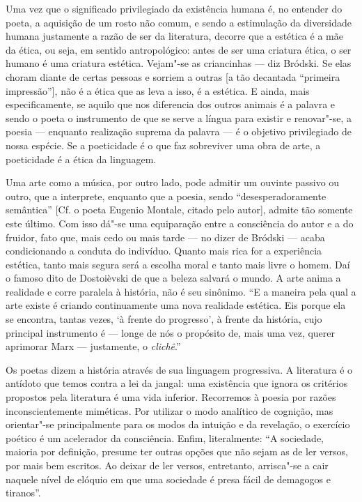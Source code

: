 Uma vez que o significado privilegiado da existência humana é, no
entender do poeta, a aquisição de um rosto não comum, e sendo a
estimulação da diversidade humana justamente a razão de ser da
literatura, decorre que a estética é a mãe da ética, ou seja, em sentido
antropológico: antes de ser uma criatura ética, o ser humano é uma
criatura estética. Vejam"-se as criancinhas --- diz Bródski. Se elas
choram diante de certas pessoas e sorriem a outras {[}a tão decantada
``primeira impressão''{]}, não é a ética que as leva a isso, é a
estética. E ainda, mais especificamente, se aquilo que nos diferencia
dos outros animais é a palavra e sendo o poeta o instrumento de que se
serve a língua para existir e renovar"-se, a poesia --- enquanto
realização suprema da palavra --- é o objetivo privilegiado de nossa
espécie. Se a poeticidade é o que faz sobreviver uma obra de arte, a
poeticidade é a ética da linguagem.

Uma arte como a música, por outro lado, pode admitir um ouvinte passivo
ou outro, que a interprete, enquanto que a poesia, sendo
``desesperadoramente semântica'' {[}Cf. o poeta Eugenio Montale, citado
pelo autor{]}, admite tão somente este último. Com isso dá"-se uma
equiparação entre a consciência do autor e a do fruidor, fato que, mais
cedo ou mais tarde --- no dizer de Bródski --- acaba condicionando a
conduta do indivíduo. Quanto mais rica for a experiência estética, tanto
mais segura será a escolha moral e tanto mais livre o homem. Daí o
famoso dito de Dostoièvski de que a beleza salvará o mundo. A arte anima
a realidade e corre paralela à história, não é seu sinônimo. ``E a
maneira pela qual a arte existe é criando continuamente uma nova
realidade estética. Eis porque ela se encontra, tantas vezes, `à frente
do progresso', à frente da história, cujo principal instrumento é ---
longe de nós o propósito de, mais uma vez, querer aprimorar Marx ---
justamente, o \emph{clichê}.''

Os poetas dizem a história através de sua linguagem progressiva. A
literatura é o antídoto que temos contra a lei da jangal: uma existência
que ignora os critérios propostos pela literatura é uma vida inferior.
Recorremos à poesia por razões inconscientemente miméticas. Por utilizar
o modo analítico de cognição, mas orientar"-se principalmente para os
modos da intuição e da revelação, o exercício poético é um acelerador da
consciência. Enfim, literalmente: ``A sociedade, maioria por definição,
presume ter outras opções que não sejam as de ler versos, por mais bem
escritos. Ao deixar de ler versos, entretanto, arrisca"-se a cair naquele
nível de elóquio em que uma sociedade é presa fácil de demagogos e
tiranos''.

